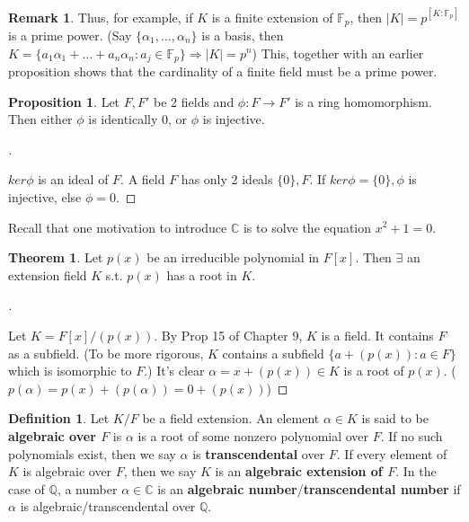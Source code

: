 \documentclass{article}
\theoremstyle{definition}
\newtheorem{thm}{Theorem}
\newtheorem{dfn}{Definition}
\newtheorem{rem}{Remark}
\newtheorem{prop}{Proposition}
\newenvironment{proofs}[1][\proofname]{%
  \begin{proof}[#1]$ $\par\nobreak\ignorespaces
}{%
  \end{proof}
}
\begin{document}
\begin{rem}
	Thus, for example, if $K$ is a finite extension of $\mathbb{F}_p$, then $|K| = p^{[K:\mathbb{F}_p]}$ is a prime power.
	(Say $\{\alpha_1, ..., \alpha_n\}$ is a basis, then $K = \{a_1 \alpha_1 + \hdots + a_n \alpha_n: a_j \in \mathbb{F}_p\} \Rightarrow |K| = p^n$)
	This, together with an earlier proposition shows that the cardinality of a finite field must be a prime power.
\end{rem}

\begin{prop}
	Let $F, F'$ be 2 fields and $\phi:F \to F'$ is a ring homomorphism. 
	Then either $\phi$ is identically 0, or $\phi$ is injective. 
\end{prop}

\begin{proofs}
	$ker\phi$ is an ideal of $F$. 
	A field $F$ has only 2 ideals $\{0\}, F$. 
	If $ker \phi = \{0\}, \phi$ is injective, else $\phi = 0$.
\end{proofs}

\par Recall that one motivation to introduce $\mathbb{C}$ is to solve the equation $x^2 + 1 = 0$.

\begin{thm}
	Let $p(x)$ be an irreducible polynomial in $F[x]$. Then $\exists$ an extension field $K$ s.t. $p(x)$ has a root in $K$.
\end{thm}

\begin{proofs}
	Let $K = F[x]/(p(x))$.
	By Prop 15 of Chapter 9, $K$ is a field.
	It contains $F$ as a subfield.
	(To be more rigorous, $K$ contains a subfield $\{a + (p(x)): a \in F\}$ which is isomorphic to $F$.)
	It's clear $\alpha = x + (p(x)) \in K$ is a root of $p(x)$.
	($p(\alpha) = p(x) + (p(\alpha)) = 0 + (p(x))$)
\end{proofs}

\begin{dfn}
	Let $K/F$ be a field extension. An element $\alpha \in K$ is said to be \textbf{algebraic over $F$} is $\alpha$ is a root of some nonzero polynomial over $F$.	
	If no such polynomials exist, then we say $\alpha$ is \textbf{transcendental} over $F$.
	If every element of $K$ is algebraic over $F$, then we say $K$ is an \textbf{algebraic extension of $F$}.
	In the case of $\mathbb{Q}$, a number $\alpha \in \mathbb{C}$ is an \textbf{algebraic number}/\textbf{transcendental number} if $\alpha$ is algebraic/transcendental over $\mathbb{Q}$. 
\end{dfn}
\end{document}
